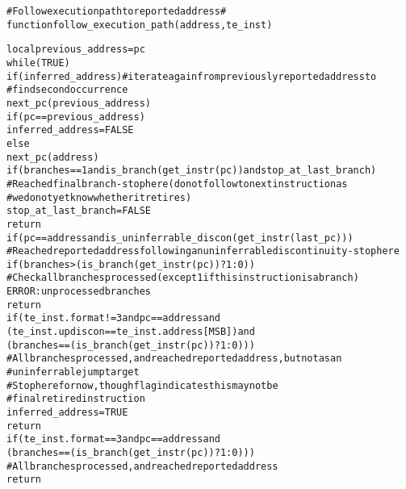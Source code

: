 \begin{alltt}
# Follow execution path to reported address #
function follow_execution_path(address, te_inst)

  local previous_address = pc
  while (TRUE)
    if (inferred_address) # iterate again from previously reported address to
                          #   find second occurrence
      next_pc(previous_address)
      if (pc == previous_address)
        inferred_address = FALSE
    else
      next_pc(address)
      if (branches == 1 and is_branch(get_instr(pc)) and stop_at_last_branch)
        # Reached final branch - stop here (do not follow to next instruction as
        #  we do not yet know whether it retires)
        stop_at_last_branch = FALSE
        return
      if (pc == address and is_uninferrable_discon(get_instr(last_pc)))
        # Reached reported address following an uninferrable discontinuity - stop here
        if (branches > (is_branch(get_instr(pc)) ? 1 : 0))
          # Check all branches processed (except 1 if this instruction is a branch)
          ERROR: unprocessed branches
        return
      if (te_inst.format != 3 and pc == address and
        (te_inst.updiscon == te_inst.address[MSB]) and
          (branches == (is_branch(get_instr(pc)) ? 1 : 0)))
            # All branches processed, and reached reported address, but not as an
            #   uninferrable jump target
            # Stop here for now, though flag indicates this may not be
            #  final retired instruction
        inferred_address = TRUE
        return
      if (te_inst.format == 3 and pc == address and
        (branches == (is_branch(get_instr(pc)) ? 1 : 0)))
        # All branches processed, and reached reported address
        return
\end{alltt}

\pagebreak

